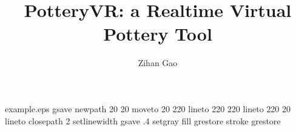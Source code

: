%
%
%
%
%
\begin{filecontents*}{example.eps}
gsave
newpath
  20 20 moveto
  20 220 lineto
  220 220 lineto
  220 20 lineto
closepath
2 setlinewidth
gsave
  .4 setgray fill
grestore
stroke
grestore
\end{filecontents*}
%
\RequirePackage{fix-cm}
%
\documentclass[smallextended]{svjour3}       %
%
\smartqed  %
%
\usepackage{graphicx}
\usepackage{amsmath}
\usepackage{enumitem}
%
%
%
%
%


\title{PotteryVR: a Realtime Virtual Pottery Tool%
}


\author{Zihan Gao         %
}


